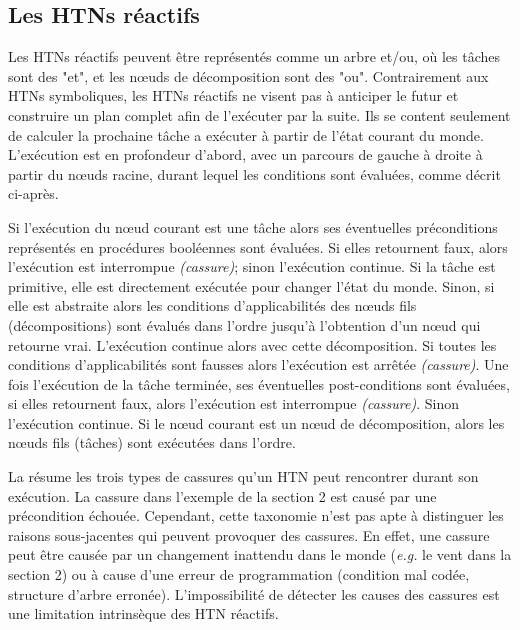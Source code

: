 \documentclass[a4paper,twoside,french]{article}
\begin{document}
		\subsection{Les HTNs réactifs}
		\par Les HTNs réactifs peuvent être représentés comme un arbre et/ou, où les tâches sont des "et", et les n\oe uds de décomposition sont des "ou". Contrairement aux HTNs symboliques, les HTNs réactifs ne visent pas à anticiper le futur et construire un plan complet afin de l'exécuter par la suite. Ils se content seulement de calculer la prochaine tâche a exécuter à partir de l'état courant du monde. L'exécution est en profondeur d'abord, avec un parcours de gauche à droite à partir du n\oe uds racine, durant lequel les conditions sont évaluées, comme décrit ci-après. 
		\par Si l'exécution du n\oe ud courant est une tâche alors ses éventuelles préconditions représentés en procédures booléennes sont évaluées. Si elles retournent faux, alors l'exécution est interrompue \textit{(cassure)}; sinon l'exécution continue. Si la tâche est primitive, elle est directement exécutée pour changer l'état du monde. Sinon, si elle est abstraite alors les conditions d'applicabilités des n\oe uds fils (décompositions) sont évalués dans l'ordre jusqu'à l'obtention d'un n\oe ud qui retourne vrai. L'exécution continue alors avec cette décomposition. Si toutes les conditions d'applicabilités sont fausses alors  l'exécution est arrêtée \textit{(cassure)}. Une fois l'exécution de la tâche terminée, ses éventuelles post-conditions sont évaluées, si elles retournent faux, alors l'exécution est interrompue \textit{(cassure)}. Sinon l'exécution continue. Si le n\oe ud courant est un n\oe ud de décomposition, alors les n\oe uds fils (tâches) sont exécutées dans l'ordre. 
		\par La  résume les trois types de cassures qu'un HTN peut rencontrer durant son exécution. La cassure dans l'exemple de la section 2 est causé par une précondition échouée. Cependant, cette taxonomie n'est pas apte à distinguer les raisons sous-jacentes qui peuvent provoquer des cassures. En effet, une cassure peut être causée par un changement inattendu dans le monde (\emph{e.g.} le vent dans la section 2) ou à cause d'une erreur de programmation (condition mal codée, structure d'arbre erronée). L'impossibilité de détecter les causes des cassures est une limitation intrinsèque des HTN réactifs.
\end{document}
